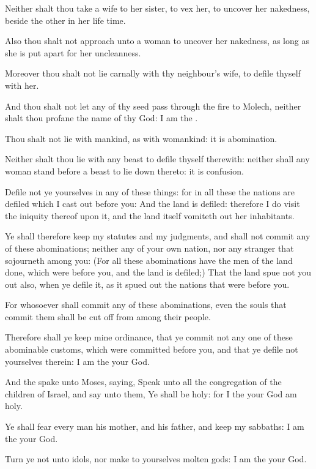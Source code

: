 \Verse Neither shalt thou take a wife to her sister, to vex her, to uncover her nakedness, beside the other in her life time.

\Verse Also thou shalt not approach unto a woman to uncover her nakedness, as long as she is put apart for her uncleanness.

\Verse Moreover thou shalt not lie carnally with thy neighbour's wife, to defile thyself with her.

\Verse And thou shalt not let any of thy seed pass through the fire to Molech, neither shalt thou profane the name of thy God: I am the \LORD.

\Verse Thou shalt not lie with mankind, as with womankind: it is abomination.

\Verse Neither shalt thou lie with any beast to defile thyself therewith: neither shall any woman stand before a beast to lie down thereto: it is confusion.

\Verse Defile not ye yourselves in any of these things: for in all these the nations are defiled which I cast out before you: \Verse And the land is defiled: therefore I do visit the iniquity thereof upon it, and the land itself vomiteth out her inhabitants.

\Verse Ye shall therefore keep my statutes and my judgments, and shall not commit any of these abominations; neither any of your own nation, nor any stranger that sojourneth among you: \Verse (For all these abominations have the men of the land done, which were before you, and the land is defiled;) \Verse That the land spue not you out also, when ye defile it, as it spued out the nations that were before you.

\Verse For whosoever shall commit any of these abominations, even the souls that commit them shall be cut off from among their people.

\Verse Therefore shall ye keep mine ordinance, that ye commit not any one of these abominable customs, which were committed before you, and that ye defile not yourselves therein: I am the \LORD your God.

\Chapter
\Verse And the \LORD spake unto Moses, saying, \Verse Speak unto all the congregation of the children of Israel, and say unto them, Ye shall be holy: for I the \LORD your God am holy.

\Verse Ye shall fear every man his mother, and his father, and keep my sabbaths: I am the \LORD your God.

\Verse Turn ye not unto idols, nor make to yourselves molten gods: I am the \LORD your God.

